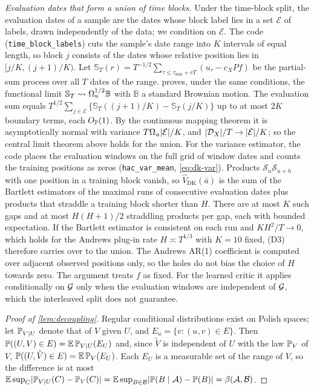 \emph{Evaluation dates that form a union of time blocks.} Under the time-block split, the
evaluation dates of a sample are the dates whose block label lies in a set $\mathcal E$ of labels,
drawn independently of the data; we condition on $\mathcal E$. The code
(\texttt{time\_block\_labels}) cuts the sample's date range into $K$ intervals of equal length, so
block $j$ consists of the dates whose relative position lies in $[j/K,(j+1)/K)$. Let
$\mathbb S_T(r)=T^{-1/2}\sum_{\tau\le\tau_{\min}+rT}(u_\tau-c_XPf)$ be the partial-sum process
over all $T$ dates of the range. \citet{herrndorf1984functional} proves, under the same conditions,
the functional limit $\mathbb S_T\rightsquigarrow\Omega_u^{1/2}\mathbb B$ with $\mathbb B$ a standard Brownian
motion. The evaluation sum equals
$T^{1/2}\sum_{j\in\mathcal E}\{\mathbb S_T((j+1)/K)-\mathbb S_T(j/K)\}$ up to at most $2K$ boundary
terms, each $O_{\mathbb{P}}(1)$. By the continuous mapping theorem it is asymptotically normal with
variance $T\Omega_u\lvert\mathcal E\rvert/K$, and $\lvert\mathcal D_X\rvert/T\to\lvert\mathcal E\rvert/K$; so the
central limit theorem above holds for the union. For the variance estimator, the code places the
evaluation windows on the full grid of window dates and counts the training positions as zeros
(\texttt{hac\_var\_mean}, \eqref{eq:dk-var}). Products $\mathcal S_u\mathcal S_{u+h}$ with one
position in a training block vanish, so $\widehat V_{\mathrm{DK}}(\bar a)$ is the sum of the Bartlett
estimators of the maximal runs of consecutive evaluation dates plus products that straddle a
training block shorter than $H$. There are at most $K$ such gaps and at most $H(H+1)/2$ straddling
products per gap, each with bounded expectation. If the Bartlett estimator is consistent on each
run and $KH^2/T\to0$, which holds for the Andrews plug-in rate $H\asymp T^{1/3}$ with $K=10$ fixed,
(D3) therefore carries over to the union. The Andrews AR(1) coefficient is computed over adjacent
observed positions only, so the holes do not bias the choice of $H$ towards zero. The argument
treats $f$ as fixed. For the learned critic it applies conditionally on $\mathcal{G}$ only when the
evaluation windows are independent of $\mathcal{G}$, which the interleaved split does not guarantee.

\begin{proof}[Proof of \cref{lem:decoupling}]
Regular conditional distributions exist on Polish spaces; let $\mathbb{P}_{V\mid U}$ denote that of $V$
given $U$, and $E_u=\{v:(u,v)\in E\}$. Then $\mathbb{P}((U,V)\in E)=\mathbb{E}\,\mathbb{P}_{V\mid U}(E_U)$ and, since
$\tilde V$ is independent of $U$ with the law $\mathbb{P}_V$ of $V$,
$\mathbb{P}((U,\tilde V)\in E)=\mathbb{E}\,\mathbb{P}_V(E_U)$. Each $E_U$ is a measurable set of the range of $V$, so
the difference is at most
$\mathbb{E}\sup_C\lvert\mathbb{P}_{V\mid U}(C)-\mathbb{P}_V(C)\rvert=\mathbb{E}\sup_{B\in\mathcal B}\lvert\mathbb{P}(B\mid\mathcal A)-\mathbb{P}(B)\rvert=\beta(\mathcal A,\mathcal B)$.
\end{proof}

